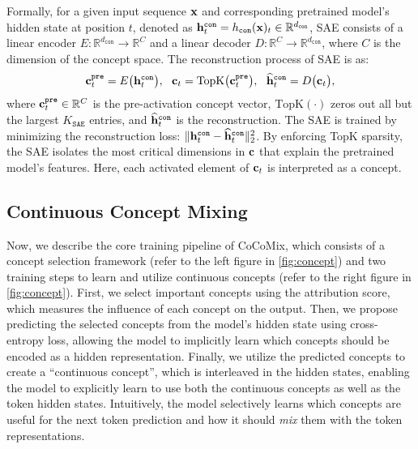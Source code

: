 \documentclass[]{fairmeta}
\newcommand{\mmname}{Continuous Concept Mixing\xspace}
\newcommand{\sname}{CoCoMix\xspace}
\begin{document}
Formally, for a given input sequence ${\mathbf{x}}$ and corresponding pretrained model's hidden state at position $t$, denoted as ${\mathbf{h}}_t^{\mathtt{con}}=h_\mathtt{con}({\mathbf{x}})_t \in \mathbb{R}^{d_\mathtt{con}}$, SAE consists of a linear encoder $E: \mathbb{R}^{d_{\mathtt{con}}} \to \mathbb{R}^{C}$ and a linear decoder $D:\mathbb{R}^{C} \to \mathbb{R}^{d_\mathtt{con}}$, where $C$ is the dimension of the concept space. The reconstruction process of SAE is as:
\begin{equation*}
    {\mathbf{c}}_t^{\mathtt{pre}} = E\bigl({\mathbf{h}}_t^\mathtt{con}\bigr), 
    ~~
    {\mathbf{c}}_t = \mathrm{TopK}\bigl({\mathbf{c}}_t^{\mathtt{pre}}\bigr),
    ~~
    \widehat{{\mathbf{h}}}_t^\mathtt{con} = D\bigl({\mathbf{c}}_t\bigr),
\end{equation*}
where ${\mathbf{c}}_t^{\mathtt{pre}}\in\mathbb{R}^{C}$ is the pre-activation concept vector, $\mathrm{TopK}(\cdot)$ zeros out all but the largest \(K_{\mathtt{SAE}}\) entries, and $\widehat{{\mathbf{h}}}_t^\mathtt{con}$ is the reconstruction. The SAE is trained by minimizing the reconstruction loss: $\lVert {\mathbf{h}}_t^\mathtt{con} - \widehat{{\mathbf{h}}}_t^\mathtt{con}\rVert_{2}^2$. By enforcing TopK sparsity, the SAE isolates the most critical dimensions in ${\mathbf{c}}$ that explain the pretrained model’s features. Here, each activated element of ${\mathbf{c}}_t$ is interpreted as a concept.


\subsection{\mmname}
\label{sec:method_cocomix}

Now, we describe the core training pipeline of \sname, which consists of a concept selection framework (refer to the left figure in \autoref{fig:concept}) and two training steps to learn and utilize continuous concepts (refer to the right figure in \autoref{fig:concept}). First, we select important concepts using the attribution score, which measures the influence of each concept on the output. Then, we propose predicting the selected concepts from the model's hidden state using cross-entropy loss, allowing the model to implicitly learn which concepts should be encoded as a hidden representation. Finally, we utilize the predicted concepts to create a ``continuous concept'', which is interleaved in the hidden states, enabling the model to explicitly learn to use both the continuous concepts as well as the token hidden states. Intuitively, the model selectively learns which concepts are useful for the next token prediction and how it should \emph{mix} them with the token representations.
\end{document}
